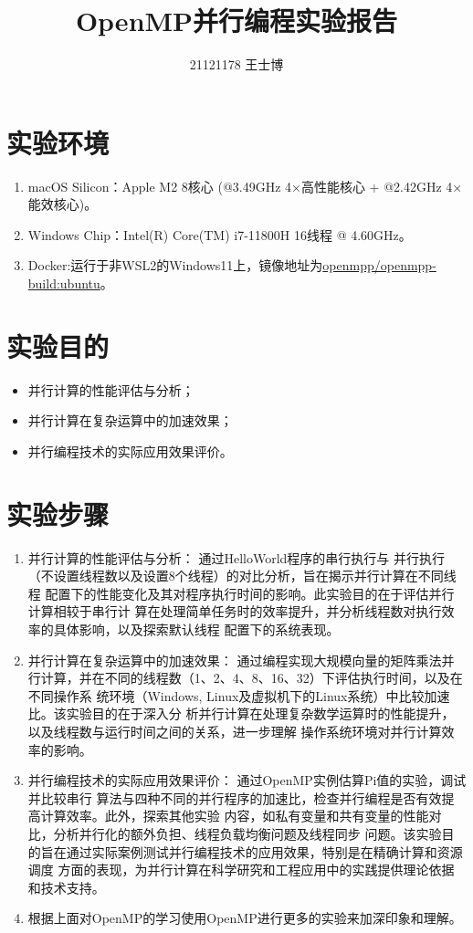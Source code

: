 \documentclass{article}
\title{\Huge OpenMP并行编程实验报告}
\author{21121178 王士博}
\begin{document}
\maketitle
\section{实验环境}
\begin{enumerate}
    \item macOS Silicon：Apple M2 8核心 (@3.49GHz 4×高性能核心 + @2.42GHz 4×能效核心)。
    \item Windows Chip：Intel(R) Core(TM) i7-11800H 16线程 @ 4.60GHz。
    \item Docker:运行于非WSL2的Windows11上，镜像地址为\url{openmpp/openmpp-build:ubuntu}。
\end{enumerate}
\section{实验目的}
\begin{itemize}
    \item 并行计算的性能评估与分析；
    \item 并行计算在复杂运算中的加速效果；
    \item 并行编程技术的实际应用效果评价。
\end{itemize}
\section{实验步骤}
\begin{enumerate}
    \item 并行计算的性能评估与分析： 通过HelloWorld程序的串行执行与
    并行执行（不设置线程数以及设置8个线程）的对比分析，旨在揭示并行计算在不同线程
    配置下的性能变化及其对程序执行时间的影响。此实验目的在于评估并行计算相较于串行计
    算在处理简单任务时的效率提升，并分析线程数对执行效率的具体影响，以及探索默认线程
    配置下的系统表现。
    \item 并行计算在复杂运算中的加速效果： 通过编程实现大规模向量的矩阵乘法并
    行计算，并在不同的线程数（1、2、4、8、16、32）下评估执行时间，以及在不同操作系
    统环境（Windows, Linux及虚拟机下的Linux系统）中比较加速比。该实验目的在于深入分
    析并行计算在处理复杂数学运算时的性能提升，以及线程数与运行时间之间的关系，进一步理解
    操作系统环境对并行计算效率的影响。
    \item 并行编程技术的实际应用效果评价： 通过OpenMP实例估算Pi值的实验，调试并比较串行
    算法与四种不同的并行程序的加速比，检查并行编程是否有效提高计算效率。此外，探索其他实验
    内容，如私有变量和共有变量的性能对比，分析并行化的额外负担、线程负载均衡问题及线程同步
    问题。该实验目的旨在通过实际案例测试并行编程技术的应用效果，特别是在精确计算和资源调度
    方面的表现，为并行计算在科学研究和工程应用中的实践提供理论依据和技术支持。
    \item 根据上面对OpenMP的学习使用OpenMP进行更多的实验来加深印象和理解。
\end{enumerate}
\end{document}

